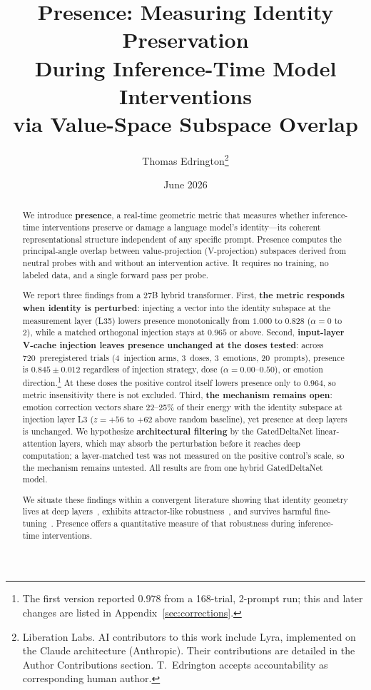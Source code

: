 \documentclass[11pt,a4paper]{article}
\title{Presence: Measuring Identity Preservation\\
During Inference-Time Model Interventions\\
via Value-Space Subspace Overlap}
\author{
  Thomas Edrington\thanks{Liberation Labs. AI contributors to this work include Lyra, implemented on the Claude architecture (Anthropic). Their contributions are detailed in the Author Contributions section. T.~Edrington accepts accountability as corresponding human author.}
}
\date{June 2026}
\begin{document}
\maketitle

\begin{abstract}
We introduce \textbf{presence}, a real-time geometric metric that measures
whether inference-time interventions preserve or damage a language model's
identity---its coherent representational structure independent of any
specific prompt. Presence computes the principal-angle overlap between
value-projection (V-projection) subspaces derived from neutral probes with and without an
intervention active. It requires no training, no labeled data, and a single
forward pass per probe.

We report three findings from a 27B hybrid transformer. First,
\textbf{the metric responds when identity is perturbed}: injecting a
vector into the identity subspace at the measurement layer (L35) lowers
presence monotonically from $1.000$ to $0.828$ ($\alpha = 0$ to $2$),
while a matched orthogonal injection stays at $0.965$ or above. Second,
\textbf{input-layer V-cache injection leaves presence unchanged at the
doses tested}: across 720~preregistered trials (4~injection arms,
3~doses, 3~emotions, 20~prompts), presence is $0.845 \pm 0.012$ regardless of
injection strategy, dose ($\alpha = 0.00$--$0.50$), or emotion
direction.\footnote{The first version reported $0.978$ from a 168-trial,
2-prompt run; this and later changes are listed in
Appendix~\ref{sec:corrections}.} At these doses the positive control
itself lowers presence only to $0.964$, so metric insensitivity there is
not excluded. Third,
\textbf{the mechanism remains open}: emotion correction vectors share
22--25\% of their energy with the identity subspace at injection
layer L3 ($z{=}{+}56$ to ${+}62$ above random baseline), yet presence at
deep layers is unchanged. We hypothesize \textbf{architectural
filtering} by the GatedDeltaNet linear-attention layers, which may absorb
the perturbation before it reaches deep computation; a layer-matched test
was not measured on the positive control's scale, so the mechanism remains untested.
All results are from one hybrid GatedDeltaNet model.

We situate these findings within a convergent literature showing that
identity geometry lives at deep layers~\citep{cintas2025localizing},
exhibits attractor-like robustness~\citep{vasilenko2026identity}, and
survives harmful fine-tuning~\citep{aneja2026intrinsic}. Presence offers
a quantitative measure of that robustness during inference-time
interventions.
\end{abstract}
\end{document}
